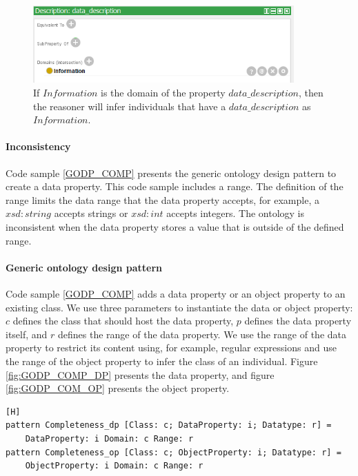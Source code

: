 \begin{figure}[H]
\centering
  \includegraphics[width=10cm]{../../Images/04_Contribution/04_data_description.png}
  \caption{If $Information$ is the domain of the property $data\_description$, then the reasoner will infer individuals that have a $data\_description$ as $Information$.}
  \label{fig:04_data_description}
\end{figure}

\paragraph{Inconsistency}
Code sample \ref{GODP_COMP} presents the generic ontology design pattern to create a data property. This code sample includes a range. The definition of the range limits the data range that the data property accepts, for example, a $xsd:string$ accepts strings or $xsd:int$ accepts integers. The ontology is inconsistent when the data property stores a value that is outside of the defined range.

\paragraph{Generic ontology design pattern}
Code sample \ref{GODP_COMP} adds a data property or an object property to an existing class. We use three parameters to instantiate the data or object property: $c$ defines the class that should host the data property, $p$ defines the data property itself, and $r$ defines the range of the data property. We use the range of the data property to restrict its content using, for example, regular expressions and use the range of the object property to infer the class of an individual. Figure \ref{fig:GODP_COMP_DP} presents the data property, and figure \ref{fig:GODP_COM_OP} presents the object property.

\begin{lstlisting}[float,language=GDOL,caption={The GDOL code for adding a required data property to an existing class using two parameters. We use $c$, $i$, and $r$ as parameters to instantiate the data or object property.},label={GODP_COMP}][H]
pattern Completeness_dp [Class: c; DataProperty: i; Datatype: r] =
	DataProperty: i Domain: c Range: r
pattern Completeness_op [Class: c; ObjectProperty: i; Datatype: r] =
	ObjectProperty: i Domain: c Range: r
\end{lstlisting}

